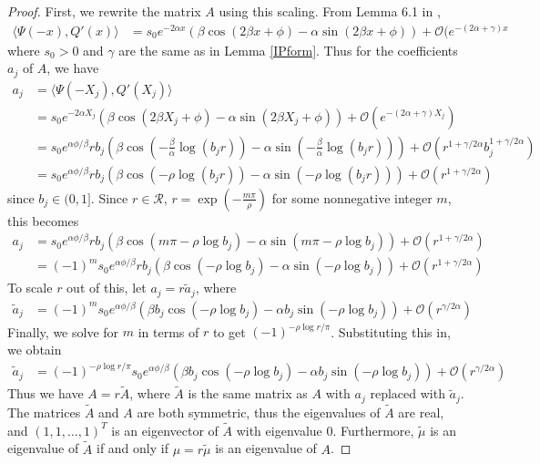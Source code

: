 \documentclass[thesis.tex]{subfiles}
\begin{document}
\begin{lemma}
\begin{proof}
First, we rewrite the matrix $A$ using this scaling. From Lemma 6.1 in \cite{Sandstede1998},
\begin{align*}\label{IPpsiQprime}
\langle \Psi(-x), Q'(x) \rangle
&= s_0 e^{-2 \alpha x}\left( \beta \cos(2 \beta x + \phi) - \alpha \sin(2 \beta x + \phi)\right) + \mathcal{O}(e^{-(2 \alpha + \gamma) x}
\end{align*}
where $s_0 > 0$ and $\gamma$ are the same as in Lemma \ref{IPform}. Thus for the coefficients $a_j$ of $A$, we have
\begin{align*}
a_j &= \langle \Psi(-X_j), Q'(X_j) \rangle \\
&= s_0 e^{-2 \alpha X_j}\left( \beta \cos(2 \beta X_j + \phi) - \alpha \sin(2 \beta X_j + \phi)\right) + \mathcal{O}(e^{-(2 \alpha + \gamma) X_j}) \\
&= s_0 e^{\alpha \phi/\beta} r b_j \left( \beta \cos\left( -\frac{\beta}{\alpha} \log(b_j r) \right) - \alpha \sin \left( -\frac{\beta}{\alpha} \log(b_j r) \right) \right) + \mathcal{O}(r^{1+\gamma/2\alpha} b_j^{1 + \gamma/2\alpha}) \\
&= s_0 e^{\alpha \phi/\beta} r b_j \left( \beta \cos\left( -\rho \log(b_j r) \right) - \alpha \sin \left( -\rho \log(b_j r) \right) \right) + \mathcal{O}(r^{1+\gamma/2\alpha})
\end{align*}
since $b_j \in (0, 1]$. Since $r \in \mathcal{R}$, $r = \exp\left(-\frac{m \pi}{\rho}\right)$ for some nonnegative integer $m$, this becomes 
\begin{align*}
a_j &= s_0 e^{\alpha \phi/\beta} r b_j \left( \beta \cos\left( m \pi -\rho \log b_j \right) - \alpha \sin \left( m \pi -\rho \log b_j \right) \right) + \mathcal{O}(r^{1+\gamma/2\alpha}) \\
&= (-1)^m s_0 e^{\alpha \phi/\beta} r b_j \left( \beta \cos\left(-\rho \log b_j \right) - \alpha \sin \left(-\rho \log b_j \right) \right) + \mathcal{O}(r^{1+\gamma/2\alpha})
\end{align*}
To scale $r$ out of this, let $a_j = r \tilde{a}_j$, where
\begin{align*}
\tilde{a}_j 
&= (-1)^m s_0 e^{\alpha \phi/\beta} \left( \beta b_j \cos\left( -\rho \log b_j \right) - \alpha b_j \sin \left( -\rho \log b_j  \right) \right) + \mathcal{O}(r^{\gamma/2\alpha})
\end{align*}
Finally, we solve for $m$ in terms of $r$ to get $(-1)^{-\rho \log r / \pi}$. Substituting this in, we obtain
\begin{align*}
\tilde{a}_j 
&= (-1)^{-\rho \log r / \pi} s_0 e^{\alpha \phi/\beta} \left( \beta b_j \cos\left( -\rho \log b_j \right) - \alpha b_j \sin \left( -\rho \log b_j  \right) \right) + \mathcal{O}(r^{\gamma/2\alpha})
\end{align*}
Thus we have $A = r \tilde{A}$, where $\tilde{A}$ is the same matrix as $A$ with $a_j$ replaced with $\tilde{a}_j$. The matrices $\tilde{A}$ and $A$ are both symmetric, thus the eigenvalues of $\tilde{A}$ are real, and $(1,1,\dots,1)^T$ is an eigenvector of $\tilde{A}$ with eigenvalue 0. Furthermore, $\tilde{\mu}$ is an eigenvalue of $\tilde{A}$ if and only if $\mu = r \tilde{\mu}$ is an eigenvalue of $A$.


\end{proof}
\end{lemma}
\end{document}
